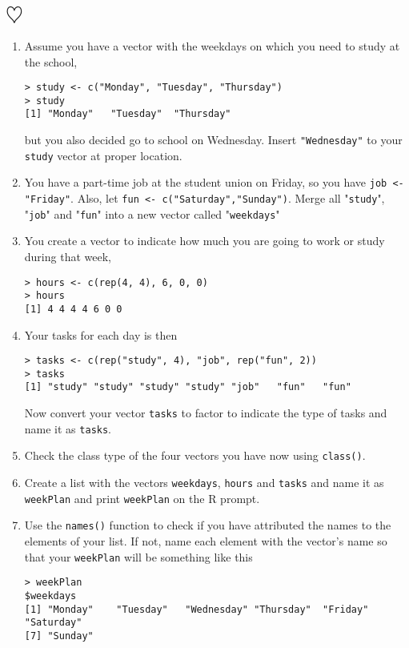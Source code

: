 \documentclass[a4paper]{article}
\begin{document}
\section{$\heartsuit$}
\begin{enumerate}
\item Assume you have a vector with the weekdays on which you need to study at the school,
\begin{verbatim}
> study <- c("Monday", "Tuesday", "Thursday")
> study
[1] "Monday"   "Tuesday"  "Thursday"
\end{verbatim}
but you also decided go to school on Wednesday. Insert \texttt{"Wednesday"} to your
\texttt{study} vector at proper location.
\item You have a part-time job at the student union on Friday, so you have
  \texttt{job <- "Friday"}. Also, let \texttt{fun <-
    c("Saturday","Sunday")}. Merge all "\texttt{study}", "\texttt{job}" and
  "\texttt{fun}" into a new vector called "\texttt{weekdays}"
\item You create a vector to indicate how much you are going to work or study
  during that week,
\begin{verbatim}
> hours <- c(rep(4, 4), 6, 0, 0)
> hours
[1] 4 4 4 4 6 0 0
\end{verbatim}

\item Your tasks for each day is then
\begin{verbatim}
> tasks <- c(rep("study", 4), "job", rep("fun", 2))
> tasks
[1] "study" "study" "study" "study" "job"   "fun"   "fun"
\end{verbatim}
  Now convert your vector \texttt{tasks} to factor to indicate the type of
  tasks and name it as \texttt{tasks}.

\item Check the class type of the four vectors you have now using \texttt{class()}.

\item Create a list with the vectors \texttt{weekdays}, \texttt{hours} and
  \texttt{tasks} and name it as \texttt{weekPlan} and print \texttt{weekPlan} on the R
  prompt.

\item Use the \texttt{names()} function to check if you have attributed the names
  to the elements of your list. If not, name each element with the vector's name so
  that your \texttt{weekPlan} will be something like this
\begin{verbatim}
> weekPlan
$weekdays
[1] "Monday"    "Tuesday"   "Wednesday" "Thursday"  "Friday"    "Saturday"
[7] "Sunday"


\end{verbatim}
\end{enumerate}
\end{document}
